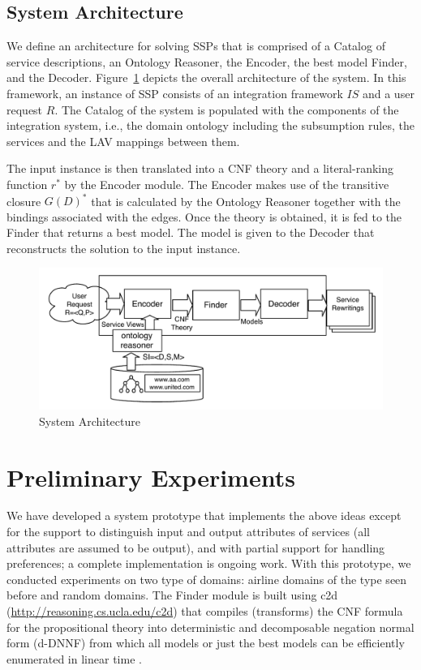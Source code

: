 \documentclass{llncs}
\begin{document}
\subsection{System Architecture}

We define an architecture for solving SSPs that is comprised of a Catalog of
service descriptions, an Ontology Reasoner, the Encoder, the best model Finder,
and the Decoder.
Figure~\ref{fig:architecture} depicts the overall architecture of the system.
In this framework, an instance of SSP consists of an integration framework $IS$
and a user request $R$.
The Catalog of the system is populated with the components of the integration system,
i.e., the domain ontology including the subsumption rules, the services and the LAV
mappings between them. 

The input instance is then translated into a CNF theory and a literal-ranking
function $r^*$ by the Encoder module. The Encoder makes use of the transitive
closure $G(D)^*$ that is calculated by the Ontology Reasoner together with the
bindings associated with the edges. Once the theory is obtained, it is fed to the
Finder that returns a best model. The model is given to the Decoder that 
reconstructs the solution to the input instance.

\begin{figure}[t]
\centering
\includegraphics[width=.8\textwidth]{architecture}
\caption{System Architecture}
\label{fig:architecture}
\end{figure}

\section{Preliminary Experiments}

We have developed a system prototype that implements the above ideas 
except for the support to distinguish input and output attributes of
services (all attributes are assumed to be output), and with 
partial support for handling preferences; a complete implementation
is ongoing work.
With this prototype, we conducted experiments on two type of domains:
airline domains of the type seen before and random domains.
The Finder module is built using c2d (\url{http://reasoning.cs.ucla.edu/c2d})
that compiles (transforms) the CNF formula for the propositional
theory into deterministic and decomposable negation normal form (d-DNNF)
from which all models or just the best models can be efficiently
enumerated in linear time \cite{darwiche:compiler}.
\end{document}
